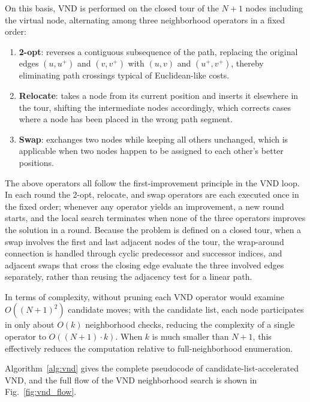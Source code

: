 \documentclass[lettersize,journal]{IEEEtran}
\begin{document}
On this basis, VND is performed on the closed tour of the $N+1$ nodes including the virtual node, alternating among three neighborhood operators in a fixed order:
\begin{enumerate}
\item \textbf{2-opt}: reverses a contiguous subsequence of the path, replacing the original edges $(u, u^{+})$ and $(v, v^{+})$ with $(u, v)$ and $(u^{+}, v^{+})$, thereby eliminating path crossings typical of Euclidean-like costs.
\item \textbf{Relocate}: takes a node from its current position and inserts it elsewhere in the tour, shifting the intermediate nodes accordingly, which corrects cases where a node has been placed in the wrong path segment.
\item \textbf{Swap}: exchanges two nodes while keeping all others unchanged, which is applicable when two nodes happen to be assigned to each other's better positions.
\end{enumerate}
The above operators all follow the first-improvement principle in the VND loop. In each round the 2-opt, relocate, and swap operators are each executed once in the fixed order; whenever any operator yields an improvement, a new round starts, and the local search terminates when none of the three operators improves the solution in a round. Because the problem is defined on a closed tour, when a swap involves the first and last adjacent nodes of the tour, the wrap-around connection is handled through cyclic predecessor and successor indices, and adjacent swaps that cross the closing edge evaluate the three involved edges separately, rather than reusing the adjacency test for a linear path.

In terms of complexity, without pruning each VND operator would examine $O((N+1)^2)$ candidate moves; with the candidate list, each node participates in only about $O(k)$ neighborhood checks, reducing the complexity of a single operator to $O((N+1)\cdot k)$. When $k$ is much smaller than $N+1$, this effectively reduces the computation relative to full-neighborhood enumeration.

Algorithm~\textcolor{blue}{\ref{alg:vnd}} gives the complete pseudocode of candidate-list-accelerated VND, and the full flow of the VND neighborhood search is shown in Fig.~\textcolor{blue}{\ref{fig:vnd_flow}}.
\end{document}
